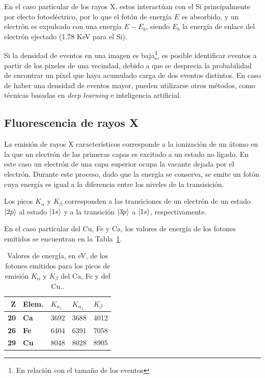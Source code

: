 \documentclass[twoside,twocolumn]{article}
\DeclarePairedDelimiter\ket{\lvert}{\rangle}
\begin{document}
      En el caso particular de los rayos X, estos interactúan con el Si principalmente por efecto fotoeléctrico,
      por lo que el fotón de energía $E$ es absorbido, y un electrón es expulsado con una energía $E-E_b$,
      siendo $E_b$ la energía de enlace del electrón ejectado (1.78 KeV para el Si)\cite{PerezCMOS}.

      Si la densidad de eventos en una imagen es baja\footnote{En relación con el tamaño de los eventos},
      es posible identificar eventos a partir de los pixeles de una vecindad,
      debido a que se desprecia la probabilidad de encontrar un píxel que haya acumulado carga de dos eventos distintos.
      En caso de haber una densidad de eventos mayor, pueden utilizarse otros métodos, como técnicas basadas en \emph{deep learning}
      e inteligencia artificial. \cite{ROE2005577} 
      
    \subsection{Fluorescencia de rayos X}\label{sec:intro:peaks}

      La emisión de rayos X característicos corresponde a la ionización de un átomo en la que un
      electrón de las primeras capas es excitado a un estado no ligado.
      En este caso un electrón de una capa superior ocupa la vacante dejada por el electrón.
      Durante este proceso, dado que la energía se conserva, se emite un fotón
      cuya energía es igual a la diferencia entre los niveles de la transisición.

      Los picos $K_\alpha$ y $K_\beta$ corresponden a las transiciones de un electrón de un estado
      $\ket{2p}$ al estado $\ket{1s}$ y a la transición $\ket{3p}$ a $\ket{1s}$, respectivamente.
      
      En el caso particular del Cu, Fe y Ca, los valores de energía de los fotones emitidos se encuentran
      en la Tabla~\ref{tab:xraypeaks}.

      \begin{table}[h]
        \centering
        \begin{tabular}{|rl|ll|l|} \hline
        \textbf{Z}  & \textbf{\small{Elem.}} & $K_{\alpha_1}$ & $K_{\alpha_2}$ & $K_\beta$ \\ \hline
        \textbf{20} & \textbf{Ca}       & 3692         & 3688         & 4012        \\
        \textbf{26} & \textbf{Fe}       & 6404         & 6391         & 7058        \\
        \textbf{29} & \textbf{Cu}       & 8048         & 8028         & 8905       \\ \hline
        \end{tabular}
        \caption{Valores de energía, en eV, de los fotones emitidos para los picos de emisión 
          $K_{\alpha}$ y $K_{\beta}$ del Ca, Fe y del Cu.\cite{xraybooklet}.}
        \label{tab:xraypeaks}
        \end{table}
\end{document}
